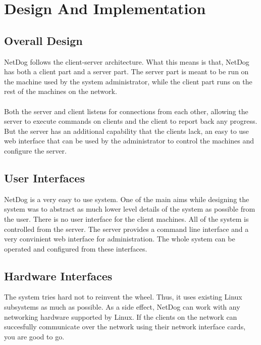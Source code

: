 \chapter{Design And Implementation}

\section{Overall Design}
NetDog follows the client-server architecture. What this means is that, NetDog
has both a client part and a server part. The server part is meant to be run
on the machine used by the system administrator, while the client part runs
on the rest of the machines on the network.
\\\\
Both the server and client listens for connections from each other, allowing
the server to execute commands on clients and the client to report back any
progress. But the server has an additional capability that the clients lack, an
easy to use web interface that can be used by the administrator to control the
machines and configure the server.

\section{User Interfaces}
NetDog is a very easy to use system. One of the main aims while designing the
system was to abstract as much lower level details of the system as possible
from the user. There is no user interface for the client machines. All of the
system is controlled from the server. The server provides a command line
interface and a very convinient web interface for administration. The whole
system can be operated and configured from these interfaces.

\section{Hardware Interfaces}
The system tries hard not to reinvent the wheel. Thus, it uses existing Linux
subsystems as much as possible. As a side effect, NetDog can work with any
networking hardware supported by Linux. If the clients on the network can
succesfully communicate over the network using their network interface cards,
you are good to go.

